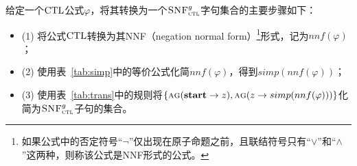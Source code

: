 给定一个$\textrm{CTL}$公式$\varphi$，将其转换为一个${\textsc{SNF}_{\textsc{ctl}}^g}$字句集合的主要步骤如下：
\begin{itemize}
	\item[] (1) 将公式$\textrm{CTL}$转换为其NNF（negation normal form）\footnote{如果公式中的否定符号“$\neg$”仅出现在原子命题之前，且联结符号只有“$\vee$”和“$\wedge$”这两种，则称该公式是NNF形式的公式。}形式，记为$nnf(\varphi)$；
	\item[] (2) 使用表~\ref{tab:simp}中的等价公式化简$nnf(\varphi)$，得到$simp(nnf(\varphi))$；
	\item[] (3) 使用表~\ref{tab:trans}中的规则将$\{\textsc{a}\textsc{g}(\textbf{start}\rightarrow z), \textsc{a}\textsc{g}(z \rightarrow simp(nnf(\varphi)))\}$化简为${\textsc{SNF}_{\textsc{ctl}}^g}$子句的集合。
\end{itemize}


